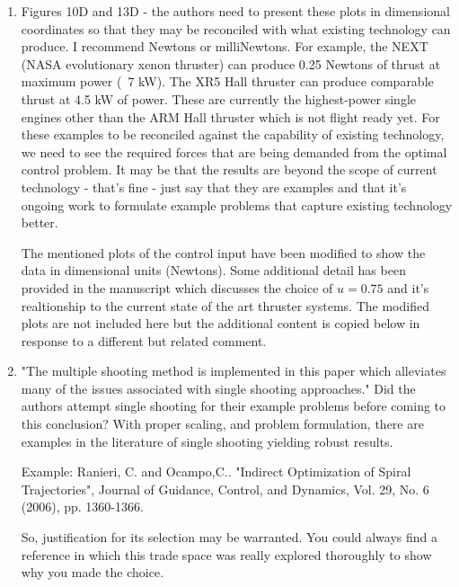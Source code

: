 \documentclass[11pt]{article}
\begin{document}
\begin{enumerate}
\item
    \begin{itshape}
Figures 10D and 13D - the authors need to present these plots in dimensional coordinates so that they may be reconciled with what existing technology can produce.  I recommend Newtons or milliNewtons.  For example, the NEXT (NASA evolutionary xenon thruster) can produce 0.25 Newtons of thrust at maximum power (~7 kW).  The XR5 Hall thruster can produce comparable thrust at 4.5 kW of power.  These are currently the highest-power single engines other than the ARM Hall thruster which is not flight ready yet.  For these examples to be reconciled against the capability of existing technology, we need to see the required forces that are being demanded from the optimal control problem.  It may be that the results are beyond the scope of current technology - that's fine - just say that they are examples and that it's ongoing work to formulate example problems that capture existing technology better.
\end{itshape}

The mentioned plots of the control input have been modified to show the data in dimensional units (Newtons). 
Some additional detail has been provided in the manuscript which discusses the choice of \( u = 0.75 \) and it's realtionship to the current state of the art thruster systems.
The modified plots are not included here but the additional content is copied below in response to a different but related comment.

\item
    \begin{itshape}
"The multiple shooting method is implemented in this paper which alleviates many of the issues associated with single shooting approaches."  Did the authors attempt single shooting for their example problems before coming to this conclusion?  With proper scaling, and problem formulation, there are examples in the literature of single shooting yielding robust results.  

Example: 
Ranieri, C. and Ocampo,C..  "Indirect Optimization of Spiral Trajectories", Journal of Guidance, Control, and Dynamics, Vol. 29, No. 6 (2006), pp. 1360-1366.

So, justification for its selection may be warranted.  You could always find a reference in which this trade space was really explored thoroughly to show why you made the choice.
\end{itshape}


\end{enumerate}
\end{document}
